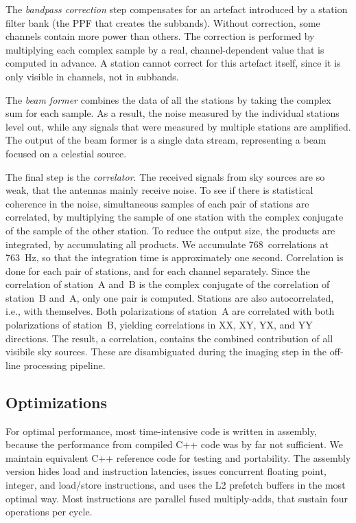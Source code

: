 \documentclass{sig-alternate}
\begin{document}
The \emph{bandpass correction} step compensates for an artefact
introduced by a station filter bank (the PPF that creates the subbands).
Without correction, some channels contain more power than others.
The correction is performed by multiplying each complex sample by a real,
channel-dependent value that is computed in advance.
A station cannot correct for this artefact itself, since it is only visible
in channels, not in subbands.

The \emph{beam former} combines the data of all the stations by taking the
complex sum for each sample. As a result, the noise measured by the individual
stations level out, while any signals that were measured by multiple stations
are amplified. The output of the beam former is a single data stream,
representing a beam focused on a celestial source.


The final step is the \emph{correlator}.
The received signals from sky sources are so weak, that the antennas mainly
receive noise.
To see if there is statistical coherence in the noise, simultaneous samples of
each pair of stations are correlated, by multiplying the sample of one station
with the complex conjugate of the sample of the other station.
To reduce the output size, the products are integrated, by accumulating all
products.
We accumulate 768~correlations at 763~Hz, so that the integration time is
approximately one second.
Correlation is done for each pair of stations, and for each channel separately.
Since the correlation of station~A and~B is the complex conjugate of the
correlation of station~B and~A, only one pair is computed.
Stations are also autocorrelated, i.e., with themselves.
Both polarizations of station~A are correlated with both polarizations of
station~B, yielding correlations in XX, XY, YX, and YY directions.
The result, a correlation, contains the combined contribution of all visibile
sky sources.
These are disambiguated during the imaging step in the off-line processing
pipeline.


\subsection{Optimizations}

For optimal performance, most time-intensive code is written in assembly,
because the performance from compiled C++ code was by far not sufficient.
We maintain equivalent C++ reference code for testing and portability.
The assembly version hides load and instruction latencies, issues concurrent
floating point, integer, and load/store instructions,
and uses the L2 prefetch buffers in the most optimal way.
Most instructions are parallel fused multiply-adds, that sustain four
operations per cycle.
\end{document}
